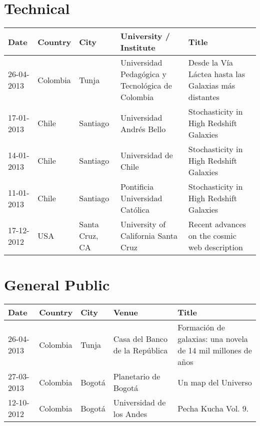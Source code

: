 \documentclass{report}
\begin{document}
\section*{Technical}

\begin{tabular}{p{2.0cm} p{1.5cm} p{1.5cm} p{2cm} p{5cm}}\hline
Date & Country & City& University / Institute & Title\\\hline
26-04-2013 & Colombia & Tunja & Universidad Pedag\'ogica y
Tecnol\'ogica de Colombia & Desde la V\'ia L\'actea hasta las Galaxias
m\'as distantes\\
17-01-2013 & Chile & Santiago  & Universidad Andr\'es Bello &
Stochasticity in High Redshift Galaxies\\
14-01-2013 & Chile & Santiago  & Universidad de Chile&
Stochasticity in High Redshift Galaxies\\
11-01-2013 & Chile & Santiago  & Pontificia Universidad Cat\'olica&
Stochasticity in High Redshift Galaxies\\
17-12-2012 & USA & Santa Cruz, CA & University of California Santa
Cruz & Recent advances on the cosmic web description  
\end{tabular}


\section*{General Public}


\begin{tabular}{p{2.0cm} p{1.5cm} p{1.5cm} p{2cm} p{5cm}}\hline
Date & Country & City& Venue& Title\\\hline
26-04-2013 & Colombia & Tunja & Casa del Banco de la Rep\'ublica &
Formaci\'on de galaxias: una novela de 14 mil millones de a\~nos\\  
27-03-2013 & Colombia & Bogot\'a & Planetario de Bogot\'a & Un map del
Universo\\
12-10-2012 & Colombia & Bogot\'a & Universidad de los Andes & Pecha
Kucha Vol. 9.
\end{tabular}
\end{document}
